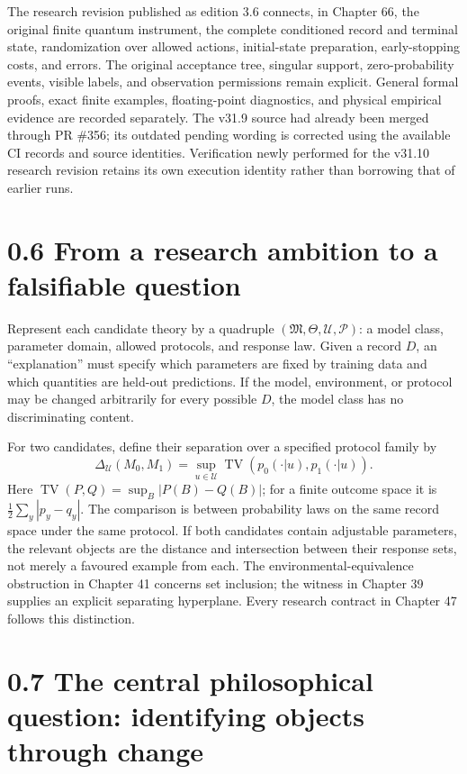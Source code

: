 \documentclass[
  11pt,
  oneside]{book}
\begin{document}
The research revision published as edition 3.6 connects, in Chapter 66,
the original finite quantum instrument, the complete conditioned record
and terminal state, randomization over allowed actions, initial-state
preparation, early-stopping costs, and errors. The original acceptance
tree, singular support, zero-probability events, visible labels, and
observation permissions remain explicit. General formal proofs, exact
finite examples, floating-point diagnostics, and physical empirical
evidence are recorded separately. The v31.9 source had already been
merged through PR \#356; its outdated pending wording is corrected using
the available CI records and source identities. Verification newly
performed for the v31.10 research revision retains its own execution
identity rather than borrowing that of earlier runs.

\section{0.6 From a research ambition to a falsifiable question}

Represent each candidate theory by a quadruple
\((\mathfrak M,\Theta,\mathcal U,\mathcal P)\): a model class, parameter
domain, allowed protocols, and response law. Given a record \(D\), an
``explanation'' must specify which parameters are fixed by training data
and which quantities are held-out predictions. If the model,
environment, or protocol may be changed arbitrarily for every possible
\(D\), the model class has no discriminating content.

For two candidates, define their separation over a specified protocol
family by \[
\Delta_{\mathcal U}(M_0,M_1)
=\sup_{u\in\mathcal U}\operatorname{TV}(p_0(\cdot|u),p_1(\cdot|u)).
\] Here \(\operatorname{TV}(P,Q)=\sup_B|P(B)-Q(B)|\); for a finite
outcome space it is \(\tfrac12\sum_y|p_y-q_y|\). The comparison is
between probability laws on the same record space under the same
protocol. If both candidates contain adjustable parameters, the relevant
objects are the distance and intersection between their response sets,
not merely a favoured example from each. The environmental-equivalence
obstruction in Chapter 41 concerns set inclusion; the witness in Chapter
39 supplies an explicit separating hyperplane. Every research contract
in Chapter 47 follows this distinction.

\section{0.7 The central philosophical question: identifying objects
through change}
\end{document}
